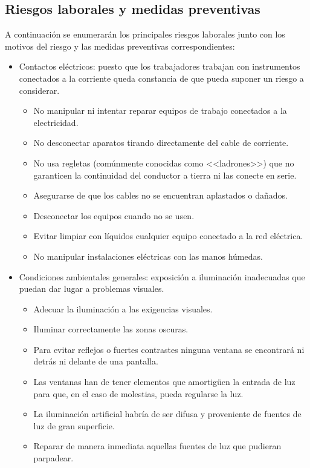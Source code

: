 \documentclass[12pt, a4paper]{book} %
\begin{document}
			\subsection{Riesgos laborales y medidas preventivas}
			A continuación se enumerarán los principales riesgos laborales junto con los motivos del riesgo y las medidas preventivas correspondientes:
			\begin{itemize}
				\item Contactos eléctricos: puesto que los trabajadores trabajan con instrumentos conectados a la corriente queda constancia de que pueda suponer un riesgo a considerar.
				\begin{itemize}
					\item No manipular ni intentar reparar equipos de trabajo conectados a la electricidad.
					\item No desconectar aparatos tirando directamente del cable de corriente.
					\item No usa regletas (comúnmente conocidas como <<ladrones>>) que no garanticen la continuidad del conductor a tierra ni las conecte en serie.
					\item Asegurarse de que  los cables no se encuentran aplastados o dañados.
					\item Desconectar los equipos cuando no se usen.
					\item Evitar limpiar con líquidos cualquier equipo conectado a la red eléctrica.
					\item No manipular instalaciones eléctricas con las manos húmedas.
				\end{itemize}
				\item Condiciones ambientales generales: exposición a iluminación inadecuadas que puedan dar lugar a problemas visuales.
				\begin{itemize}
					\item Adecuar la iluminación a las exigencias visuales.
					\item Iluminar correctamente las zonas oscuras.
					\item Para evitar reflejos o fuertes contrastes ninguna ventana se encontrará ni detrás ni delante de una pantalla.
					\item Las ventanas han de tener elementos que amortigüen la entrada de luz para que, en el caso de molestias, pueda regularse la luz.
					\item La iluminación artificial habría de ser difusa y proveniente de fuentes de luz de gran superficie.
					\item Reparar de manera inmediata aquellas fuentes de luz que pudieran parpadear.

\end{itemize}
\end{itemize}
\end{document}
